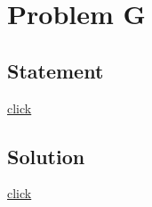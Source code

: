 \section{Problem G}
    \subsection{Statement}
        {\color{blue} \href{http://codeforces.com/problemset/problem/264/C}{click}}

    \subsection{Solution}
        {\color{blue} \href{http://codeforces.com/blog/entry/6478}{click}}

